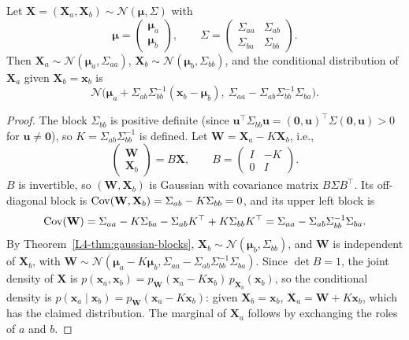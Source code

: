 \begin{theorem}\label{L4-thm:gaussian-conditional}
    Let $\mathbf{X} = (\mathbf{X}_a, \mathbf{X}_b) \sim \mathcal{N}(\boldsymbol{\mu}, \Sigma)$ with
    \[\boldsymbol{\mu} = \begin{pmatrix} \boldsymbol{\mu}_a \\ \boldsymbol{\mu}_b \end{pmatrix}, \qquad \Sigma = \begin{pmatrix} \Sigma_{aa} & \Sigma_{ab} \\ \Sigma_{ba} & \Sigma_{bb} \end{pmatrix}.\]
    Then $\mathbf{X}_a \sim \mathcal{N}(\boldsymbol{\mu}_a, \Sigma_{aa})$, $\mathbf{X}_b \sim \mathcal{N}(\boldsymbol{\mu}_b, \Sigma_{bb})$, and the conditional distribution of $\mathbf{X}_a$ given $\mathbf{X}_b = \mathbf{x}_b$ is
    \[\mathcal{N}\big(\boldsymbol{\mu}_a + \Sigma_{ab}\Sigma_{bb}^{-1}(\mathbf{x}_b - \boldsymbol{\mu}_b), \ \Sigma_{aa} - \Sigma_{ab}\Sigma_{bb}^{-1}\Sigma_{ba}\big).\]
\end{theorem}

\begin{proof}
    The block $\Sigma_{bb}$ is positive definite (since $\mathbf{u}^\top\Sigma_{bb}\mathbf{u} = (\mathbf{0}, \mathbf{u})^\top\Sigma(\mathbf{0}, \mathbf{u}) > 0$ for $\mathbf{u} \neq \mathbf{0}$), so $K = \Sigma_{ab}\Sigma_{bb}^{-1}$ is defined. Let $\mathbf{W} = \mathbf{X}_a - K\mathbf{X}_b$, i.e.,
    \[\begin{pmatrix} \mathbf{W} \\ \mathbf{X}_b \end{pmatrix} = B\mathbf{X}, \qquad B = \begin{pmatrix} I & -K \\ 0 & I \end{pmatrix}.\]
    $B$ is invertible, so $(\mathbf{W}, \mathbf{X}_b)$ is Gaussian with covariance matrix $B\Sigma B^\top$. Its off-diagonal block is $\operatorname{Cov}(\mathbf{W}, \mathbf{X}_b) = \Sigma_{ab} - K\Sigma_{bb} = 0$, and its upper left block is
    \[\operatorname{Cov}(\mathbf{W}) = \Sigma_{aa} - K\Sigma_{ba} - \Sigma_{ab}K^\top + K\Sigma_{bb}K^\top = \Sigma_{aa} - \Sigma_{ab}\Sigma_{bb}^{-1}\Sigma_{ba}.\]
    By Theorem~\ref{L4-thm:gaussian-blocks}, $\mathbf{X}_b \sim \mathcal{N}(\boldsymbol{\mu}_b, \Sigma_{bb})$, and $\mathbf{W}$ is independent of $\mathbf{X}_b$, with $\mathbf{W} \sim \mathcal{N}(\boldsymbol{\mu}_a - K\boldsymbol{\mu}_b, \Sigma_{aa} - \Sigma_{ab}\Sigma_{bb}^{-1}\Sigma_{ba})$. Since $\det B = 1$, the joint density of $\mathbf{X}$ is $p(\mathbf{x}_a, \mathbf{x}_b) = p_{\mathbf{W}}(\mathbf{x}_a - K\mathbf{x}_b)\,p_{\mathbf{X}_b}(\mathbf{x}_b)$, so the conditional density is $p(\mathbf{x}_a \mid \mathbf{x}_b) = p_{\mathbf{W}}(\mathbf{x}_a - K\mathbf{x}_b)$: given $\mathbf{X}_b = \mathbf{x}_b$, $\mathbf{X}_a = \mathbf{W} + K\mathbf{x}_b$, which has the claimed distribution. The marginal of $\mathbf{X}_a$ follows by exchanging the roles of $a$ and $b$.
\end{proof}

